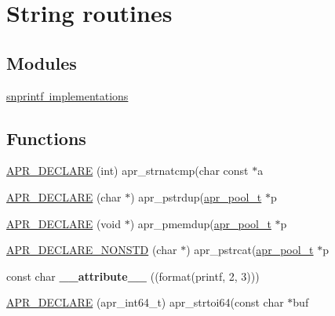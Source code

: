 \hypertarget{group__apr__strings}{}\section{String routines}
\label{group__apr__strings}
\subsection*{Modules}
\begin{DoxyCompactItemize}
\item 
\mbox{\hyperlink{group___a_p_r___strings___snprintf}{snprintf implementations}}
\end{DoxyCompactItemize}
\subsection*{Functions}
\begin{DoxyCompactItemize}
\item 
\mbox{\hyperlink{group__apr__strings_gad294ac1597b7ef2e799d42be2aebd407}{A\+P\+R\+\_\+\+D\+E\+C\+L\+A\+RE}} (int) apr\+\_\+strnatcmp(char const $\ast$a
\item 
\mbox{\hyperlink{group__apr__strings_ga46c098340ca16c99fa759f213596ea4c}{A\+P\+R\+\_\+\+D\+E\+C\+L\+A\+RE}} (char $\ast$) apr\+\_\+pstrdup(\mbox{\hyperlink{group__apr__pools_gaf137f28edcf9a086cd6bc36c20d7cdfb}{apr\+\_\+pool\+\_\+t}} $\ast$p
\item 
\mbox{\hyperlink{group__apr__strings_ga6cbdbfc3228801b7ae7b07ac7d90b82b}{A\+P\+R\+\_\+\+D\+E\+C\+L\+A\+RE}} (void $\ast$) apr\+\_\+pmemdup(\mbox{\hyperlink{group__apr__pools_gaf137f28edcf9a086cd6bc36c20d7cdfb}{apr\+\_\+pool\+\_\+t}} $\ast$p
\item 
\mbox{\hyperlink{group__apr__strings_ga832025175d31b508bbb7f2ae2c86b40c}{A\+P\+R\+\_\+\+D\+E\+C\+L\+A\+R\+E\+\_\+\+N\+O\+N\+S\+TD}} (char $\ast$) apr\+\_\+pstrcat(\mbox{\hyperlink{group__apr__pools_gaf137f28edcf9a086cd6bc36c20d7cdfb}{apr\+\_\+pool\+\_\+t}} $\ast$p
\item 
\mbox{\label{group__apr__strings_ga44bb214856b287cad23bb7a57bbdd7ac}} 
const char {\bfseries \+\_\+\+\_\+attribute\+\_\+\+\_\+} ((format(printf, 2, 3)))
\item 
\mbox{\hyperlink{group__apr__strings_ga51f9a4b11c74398accfa0fb5f880c9ee}{A\+P\+R\+\_\+\+D\+E\+C\+L\+A\+RE}} (apr\+\_\+int64\+\_\+t) apr\+\_\+strtoi64(const char $\ast$buf
\end{DoxyCompactItemize}
